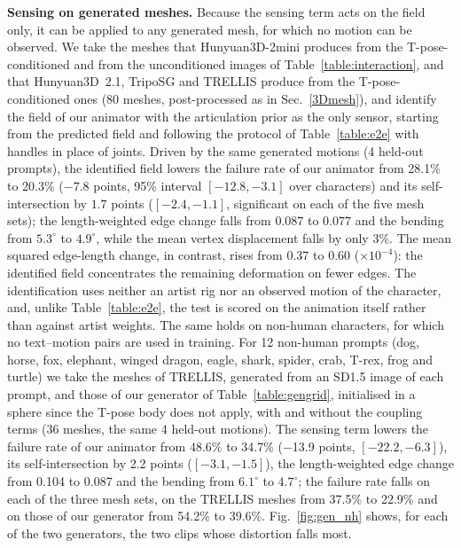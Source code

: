 \documentclass[lettersize,journal]{IEEEtran}
\newenvironment{revblock}{\par\color{red}}{\par}
\begin{document}
\begin{revblock}
\textbf{Sensing on generated meshes.} Because the sensing term acts on the field only, it can be
applied to any generated mesh, for which no motion can be observed. We take the meshes that
Hunyuan3D-2mini produces from the T-pose-conditioned and from the unconditioned images of
Table~\ref{table:interaction}, and that Hunyuan3D~2.1, TripoSG and TRELLIS produce from the
T-pose-conditioned ones (80 meshes, post-processed as in Sec.~\ref{3Dmesh}), and identify the field
of our animator with the articulation prior as the only sensor, starting from the predicted field
and following the protocol of Table~\ref{table:e2e} with handles in place of joints. Driven by the
same generated motions (4 held-out prompts), the identified field lowers the failure rate of our
animator from 28.1\% to 20.3\% ($-7.8$ points, 95\% interval $[-12.8,-3.1]$ over characters) and
its self-intersection by $1.7$ points ($[-2.4,-1.1]$, significant on each of the five mesh sets);
the length-weighted edge change falls from $0.087$ to $0.077$ and the bending from $5.3^{\circ}$ to
$4.9^{\circ}$, while the mean vertex displacement falls by only 3\%. The mean squared edge-length
change, in contrast, rises from $0.37$ to $0.60$ ($\times10^{-4}$): the identified field
concentrates the remaining deformation on fewer edges. The identification uses neither an artist
rig nor an observed motion of the character, and, unlike Table~\ref{table:e2e}, the test is scored
on the animation itself rather than against artist weights. The same holds on non-human characters, for which no text--motion pairs are used in training. For 12 non-human prompts (dog, horse, fox, elephant, winged dragon, eagle, shark, spider, crab, T-rex, frog and turtle) we take the meshes of TRELLIS, generated from an SD1.5 image of each prompt, and those of our generator of Table~\ref{table:gengrid}, initialised in a sphere since the T-pose body does not apply, with and without the coupling terms (36 meshes, the same 4 held-out motions). The sensing term lowers the failure rate of our animator from 48.6\% to 34.7\% ($-$13.9 points, $[-22.2,-6.3]$), its self-intersection by 2.2 points ($[-3.1,-1.5]$), the length-weighted edge change from 0.104 to 0.087 and the bending from $6.1^{\circ}$ to $4.7^{\circ}$; the failure rate falls on each of the three mesh sets, on the TRELLIS meshes from 37.5\% to 22.9\% and on those of our generator from 54.2\% to 39.6\%. Fig.~\ref{fig:gen_nh} shows, for each of the two generators, the two clips whose distortion falls most.
\end{revblock}
\end{document}
